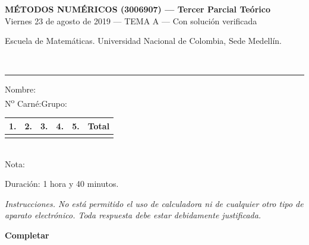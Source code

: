 \documentclass[11pt]{article}
\newcommand{\examheader}{%
  \noindent
  \begin{minipage}[t]{0.6\linewidth}
    {\small\bfseries MÉTODOS NUMÉRICOS (3006907) --- Tercer Parcial Teórico}\\
    {\small Viernes 23 de agosto de 2019 --- TEMA A --- Con solución verificada}
  \end{minipage}%
  \hfill
  \begin{minipage}[t]{0.35\linewidth}
    \raggedleft\small Escuela de Matemáticas. Universidad Nacional de Colombia, Sede Medellín.
  \end{minipage}\\[2pt]
  \rule{\linewidth}{0.6pt}
}
\begin{document}
\examheader

\vspace{4pt}
\noindent
\begin{minipage}[t]{0.62\linewidth}
Nombre:\underline{\hspace{9cm}}\\[6pt]
N\textsuperscript{o} Carné:\underline{\hspace{4cm}}\quad Grupo:\underline{\hspace{2.5cm}}
\end{minipage}%
\hfill
\begin{minipage}[t]{0.33\linewidth}
\begin{center}
\begin{tabular}{|c|c|c|c|c|c|}
\hline
1. & 2. & 3. & 4. & 5. & Total \\
\hline
 & & & & & \\
\hline
\end{tabular}\\[6pt]
Nota:\underline{\hspace{2cm}}
\end{center}
\end{minipage}

\vspace{6pt}
\noindent Duración: 1 hora y 40 minutos.

\vspace{6pt}
\noindent\textit{Instrucciones. No está permitido el uso de calculadora ni de cualquier otro tipo de aparato electrónico. Toda respuesta debe estar debidamente justificada.}

\vspace{10pt}

\noindent{} \textbf{Completar}
\end{document}
